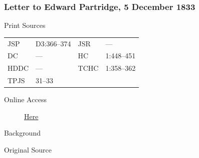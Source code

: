 		\subsubsection{Letter to Edward Partridge, 5 December 1833}
			\label{EMS-1833-JS-5-DEC-1833}
		
			\begin{description}
				\item[Print Sources]
			\end{description}

				\begin{tabular}{p{0.5in}p{1in}p{0.5in}p{1in}}
				JSP	 	& D3:366--374		& JSR 		& --- \\
				DC	 	& --- 				& HC 		& 1:448--451 \\
				HDDC 	& ---				& TCHC 		& 1:358--362 \\
				TPJS 	& 31--33			& 	 		&  \\
				\end{tabular}
			
			\begin{description}
				\item[Online Access] \href{https://www.josephsmithpapers.org/paper-summary/letter-to-edward-partridge-5-december-1833/1}{Here}
			\end{description}
			
			\begin{description}
				\item[Background]
			\end{description}
			
			
			\begin{description}
				\item[Original Source]
			\end{description}
			
			
